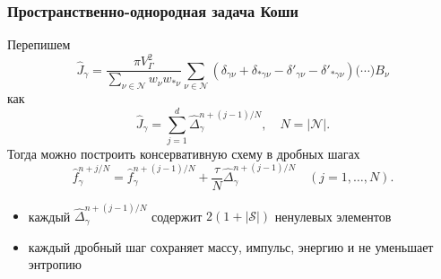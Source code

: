 \documentclass[mathserif]{beamer} %
\newcommand{\Nu}{\mathcal{N}}
\begin{document}
\begin{frame}
    \frametitle{Пространственно-однородная задача Коши}
    Перепишем
    \begin{equation}
        \hat{J}_\gamma = \frac{\pi V_\Gamma^2}{\sum_{\nu\in\Nu} w_{\nu}w_{*\nu}}
        \sum_{\nu\in\Nu} \left(
            \delta_{\gamma\nu} + \delta_{*\gamma\nu} -
            \delta'_{\gamma\nu} - \delta'_{*\gamma\nu}
        \right)\big(\cdots\big)B_\nu
    \end{equation}
    как
    \begin{equation}
        \hat{J}_{\gamma} = \sum_{j=1}^d \hat{\Delta}_{\gamma}^{n+(j-1)/N}, \quad N=|\Nu|.
    \end{equation}
    Тогда можно построить консервативную схему в дробных шагах %
    \begin{equation}\label{eq:fractional_step_scheme}
        \hat{f}_\gamma^{n+j/N} = \hat{f}_\gamma^{n+(j-1)/N} + \frac{\tau}{N}\hat{\Delta}_{\gamma}^{n+(j-1)/N}
        \quad (j = 1,\dotsc,N).
    \end{equation}
    \pause %
    \begin{itemize}
        \item каждый \(\hat{\Delta}_{\gamma}^{n+(j-1)/N}\) содержит \(2(1+|\mathcal{S}|)\) ненулевых элементов
        \item каждый дробный шаг сохраняет массу, импульс, энергию и не уменьшает энтропию
    \end{itemize}
\end{frame}
\end{document}

